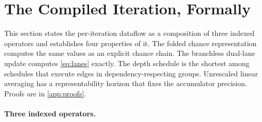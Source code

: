 \section{The Compiled Iteration, Formally}
\label{sec:theory}

This section states the per-iteration dataflow as a composition of three indexed
operators and establishes four properties of it. The folded chance representation
computes the same values as an explicit chance chain. The branchless dual-lane update
computes \cref{eq:lanes} exactly. The depth schedule is the shortest among schedules
that execute edges in dependency-respecting groups. Unrescaled linear averaging has a
representability horizon that fixes the accumulator precision. Proofs are in
\cref{app:proofs}.

\paragraph{Three indexed operators.}
\label{sec:operators}

